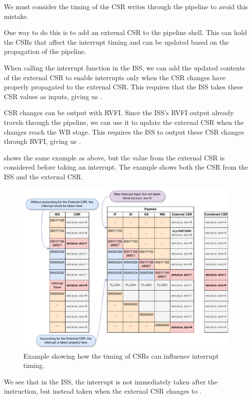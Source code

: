 We must consider the timing of the CSR writes through the pipeline to avoid this mistake.

One way to do this is to add an external CSR to the pipeline shell. This can hold the CSRs that affect the interrupt timing and can be updated based on the propagation of the pipeline.


When calling the interrupt function in the ISS, we can add the updated contents of the external CSR to enable interrupts only when the CSR changes have properly propagated to the external CSR. This requires that the ISS takes these CSR values as inputs, giving us .

CSR changes can be output with RVFI. Since the ISS's RVFI output already travels through the pipeline, we can use it to update the external CSR when the changes reach the WB stage. This requires the ISS to output these CSR changes through RVFI, giving us .


 shows the same example as above, but the value from the external CSR is considered before taking an interrupt. The example shows both the CSR from the ISS and the external CSR.

\begin{figure}
    \centering
    \includegraphics[width=1\linewidth]{figures/mret_example.pdf}
    \caption{Example showing how the timing of CSRs can influence interrupt timing.}
    \label{fig:mret_example}
\end{figure}

We see that in the ISS, the interrupt is not immediately taken after the  instruction, but instead taken when the external CSR changes to .

